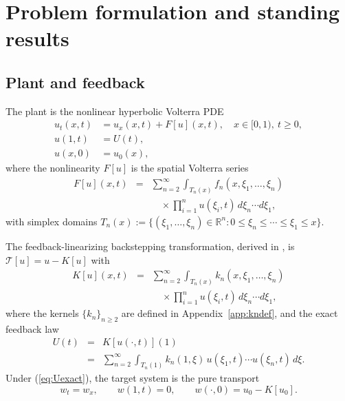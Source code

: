 \documentclass[amsthm]{autart}
\theoremstyle{plain}
\theoremstyle{definition}
\newcommand{\R}{\mathbb{R}}
\newcommand{\Tcal}{\mathcal{T}}
\begin{document}
\section{Problem formulation and standing results}\label{sec:problem}

\subsection{Plant and feedback}\label{sec:plant}

The plant is the nonlinear hyperbolic Volterra PDE
\begin{align}
u_t(x,t) &= u_x(x,t) + F[u](x,t), \quad x \in [0,1), \ t \ge 0, \label{eq:plant} \\
u(1,t) &= U(t), \label{eq:plant_bdy}\\
u(x,0) &= u_0(x), \label{eq:plant_ic}
\end{align}
where the nonlinearity $F[u]$ is the spatial Volterra series
\begin{eqnarray}
F[u](x,t) &=& \sum_{n=2}^\infty \int_{T_n(x)} f_n(x,\xi_1,\ldots,\xi_n) \nonumber \\
&& \quad \times \prod_{i=1}^n u(\xi_i,t)\, d\xi_n \cdots d\xi_1,
\label{eq:Fdef}
\end{eqnarray}
with simplex domains $T_n(x) := \{(\xi_1,\ldots,\xi_n) \in \R^n : 0 \le \xi_n \le \cdots \le \xi_1 \le x\}$.

The feedback-linearizing backstepping transformation, derived in \cite{krstic2026feedbacklinearizationhyperbolicpdes}, is $\Tcal[u] = u - K[u]$ with
\begin{eqnarray}
K[u](x,t) &=& \sum_{n=2}^\infty \int_{T_n(x)} k_n(x,\xi_1,\ldots,\xi_n) \nonumber \\
&& \quad \times \prod_{i=1}^n u(\xi_i,t)\, d\xi_n \cdots d\xi_1,
\label{eq:Kdef}
\end{eqnarray}
where the kernels $\{k_n\}_{n \ge 2}$ are defined in Appendix~\ref{app:kndef}, and the exact feedback law
\begin{eqnarray}
U(t) &=& K[u(\cdot,t)](1) \nonumber \\
&=& \sum_{n=2}^\infty \int_{T_n(1)} k_n(1,\xi)\, u(\xi_1,t)\cdots u(\xi_n,t)\, d\xi.
\label{eq:Uexact}
\end{eqnarray}
Under (\ref{eq:Uexact}), the target system is the pure transport
\begin{equation}
w_t = w_x, \qquad w(1,t) = 0, \qquad w(\cdot,0) = u_0 - K[u_0].
\label{eq:target_exact}
\end{equation}
\end{document}
